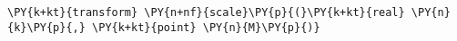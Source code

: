 \begin{Verbatim}[commandchars=\\\{\}]
    \PY{k+kt}{transform} \PY{n+nf}{scale}\PY{p}{(}\PY{k+kt}{real} \PY{n}{k}\PY{p}{,} \PY{k+kt}{point} \PY{n}{M}\PY{p}{)}
\end{Verbatim}
